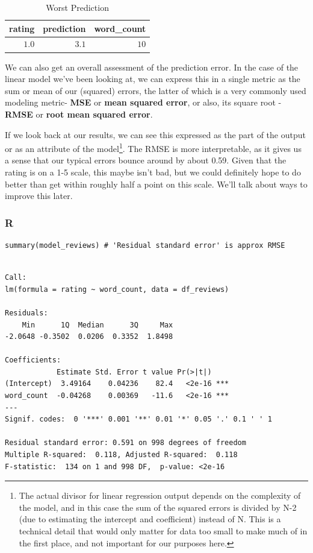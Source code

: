 \documentclass[
  letterpaper,
]{krantz}
\begin{document}
\begin{longtable}{rrr}

\caption{\label{tbl-worst-prediction}Worst Prediction}

\tabularnewline

\toprule
rating & prediction & word\_count \\ 
\midrule\addlinespace[2.5pt]
\textcolor[HTML]{404040}{$1.0$} & \textcolor[HTML]{404040}{$3.1$} & \textcolor[HTML]{404040}{$10$} \\ 
\bottomrule

\end{longtable}

We can also get an overall assessment of the prediction error. In the
case of the linear model we've been looking at, we can express this in a
single metric as the sum or mean of our (squared) errors, the latter of
which is a very commonly used modeling metric- \textbf{MSE} or
\textbf{mean squared error}, or also, its square root - \textbf{RMSE} or
\textbf{root mean squared error}.

If we look back at our results, we can see this expressed as the part of
the output or as an attribute of the model\footnote{The actual divisor
  for linear regression output depends on the complexity of the model,
  and in this case the sum of the squared errors is divided by N-2 (due
  to estimating the intercept and coefficient) instead of N. This is a
  technical detail that would only matter for data too small to make
  much of in the first place, and not important for our purposes here.}.
The RMSE is more interpretable, as it gives us a sense that our typical
errors bounce around by about 0.59. Given that the rating is on a 1-5
scale, this maybe isn't bad, but we could definitely hope to do better
than get within roughly half a point on this scale. We'll talk about
ways to improve this later.

\subsubsection{R}

\begin{verbatim}
summary(model_reviews) # 'Residual standard error' is approx RMSE
\end{verbatim}

\begin{verbatim}

Call:
lm(formula = rating ~ word_count, data = df_reviews)

Residuals:
    Min      1Q  Median      3Q     Max 
-2.0648 -0.3502  0.0206  0.3352  1.8498 

Coefficients:
            Estimate Std. Error t value Pr(>|t|)    
(Intercept)  3.49164    0.04236    82.4   <2e-16 ***
word_count  -0.04268    0.00369   -11.6   <2e-16 ***
---
Signif. codes:  0 '***' 0.001 '**' 0.01 '*' 0.05 '.' 0.1 ' ' 1

Residual standard error: 0.591 on 998 degrees of freedom
Multiple R-squared:  0.118, Adjusted R-squared:  0.118 
F-statistic:  134 on 1 and 998 DF,  p-value: <2e-16
\end{verbatim}
\end{document}
